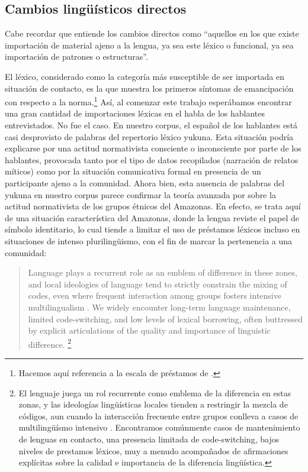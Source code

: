 \documentclass[output=paper]{langscibook}
\begin{document}
\largerpage
\subsection{Cambios lingüísticos directos}


Cabe recordar que \citet[22]{PalaciosAlcaine2011} entiende los cambios directos como “aquellos en los que existe importación de material ajeno a la lengua, ya sea este léxico o funcional, ya sea importación de patrones o estructuras”.

El léxico, considerado como la categoría más susceptible de ser importada en situación de contacto, es la que muestra los primeros síntomas de emancipación con respecto a la norma.\footnote{Hacemos aquí referencia a la escala de préstamos de    \citet{ThomasonKaufman1988}.} Así, al comenzar este trabajo esperábamos encontrar una gran cantidad de importaciones léxicas en el habla de los hablantes entrevistados.  No fue el caso. En nuestro corpus, el español de los hablantes está casi desprovisto de palabras del repertorio léxico yukuna. Esta situación podría explicarse por una actitud normativista consciente o inconsciente por parte de los hablantes, provocada tanto por el tipo de datos recopilados (narración de relatos míticos) como por la situación comunicativa formal en presencia de un participante ajeno a la comunidad. Ahora bien, esta ausencia de palabras del yukuna en nuestro corpus parece confirmar la teoría avanzada por \citet[937]{EppsMichael2017} sobre la actitud normativista de los grupos étnicos del Amazonas. En efecto, se trata aquí de una situación característica del Amazonas, donde la lengua reviste el papel de símbolo identitario, lo cual tiende a limitar el uso de préstamos léxicos incluso en situaciones de intenso plurilingüismo, con el fin de marcar la pertenencia a una comunidad:

\begin{quote}
Language plays a recurrent role as an emblem of difference in these zones, and local ideologies of language tend to strictly constrain the mixing of codes, even where frequent interaction among groups fosters intensive multilingualism \citep{Hill1996}. We widely encounter long-term language maintenance, limited code-switching, and low levels of lexical borrowing, often buttressed by explicit articulations of the quality and importance of linguistic difference.
\citet[937]{EppsMichael2017}\footnote{El lenguaje juega un rol recurrente como emblema de la diferencia en estas zonas, y las ideologías lingüísticas locales tienden a restringir la mezcla de códigos, aun cuando la interacción frecuente entre grupos conlleva a casos de multilingüísmo intensivo \citep{Hill1996}. Encontramos comúnmente casos de mantenimiento de lenguas en contacto, una presencia limitada de code-switching, bajos niveles de prestamos léxicos, muy  a menudo acompañados de afirmaciones explícitas sobre la calidad e importancia de la diferencia lingüística.}\end{quote}
\end{document}

